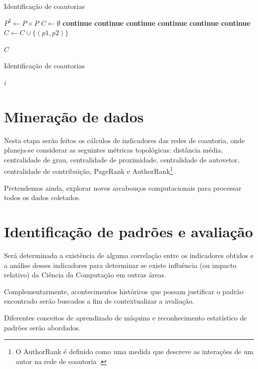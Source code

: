 \begin{algorithm}
\caption{Identificação de coautorias}
\label{alg:coautoria}
\begin{algorithmic}[1]

\State $P^2\gets P\times{P}$
\State $C\gets \emptyset$
\State \textbf{continue}
\State \textbf{continue}
\State \textbf{continue}
\State \textbf{continue}
\State \textbf{continue}
\State \textbf{continue}
\Else
\State $C\gets C\cup\{(p1, p2)\}$
\EndIf
\EndFor

\State \Return $C$
\EndProcedure

\end{algorithmic}
\end{algorithm}

\begin{algorithm}
\caption{Identificação de coautorias}
\label{alg:levenshtein}
\begin{algorithmic}[1]

\State \Return $i$
\EndProcedure

\end{algorithmic}
\end{algorithm}

\section{Mineração de dados}

Nesta etapa serão feitos os cálculos de indicadores das redes de coautoria, onde planeja-se considerar as seguintes métricas topológicas: distância média, centralidade de grau, centralidade de proximidade, centralidade de autovetor, centralidade de contribuição, PageRank e AuthorRank\footnote{O AuthorRank é definido como uma medida que descreve as interações de um autor na rede de coautoria \cite{liu2005co}.}.

Pretendemos ainda, explorar novos arcabouços computacionais para processar todos os dados coletados.

\section{Identificação de padrões e avaliação}

Será determinada a existência de alguma correlação entre os indicadores obtidos e a análise desses indicadores para determinar se existe influência (ou impacto relativo) da Ciência da Computação em outras áreas.

Complementarmente, acontecimentos históricos que possam justificar o padrão encontrado serão buscados a fim de contextualizar a avaliação.

Diferentes conceitos de aprendizado de máquina e reconhecimento estatístico de padrões serão abordados.
